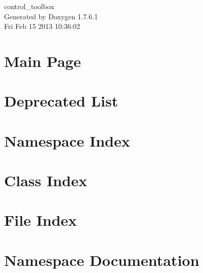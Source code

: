 \documentclass[a4paper]{book}
\begin{document}
\begin{titlepage}
\vspace*{7cm}
\begin{center}
{\Large control\-\_\-toolbox }\\
\vspace*{1cm}
{\large \-Generated by Doxygen 1.7.6.1}\\
\vspace*{0.5cm}
{\small Fri Feb 15 2013 10:36:02}\\
\end{center}
\end{titlepage}
\clearemptydoublepage
{}
\tableofcontents
\clearemptydoublepage
{}
\chapter{\-Main \-Page}
\label{index}
\chapter{\-Deprecated \-List}
\label{deprecated}

\chapter{\-Namespace \-Index}

\chapter{\-Class \-Index}

\chapter{\-File \-Index}

\chapter{\-Namespace \-Documentation}









\end{document}
